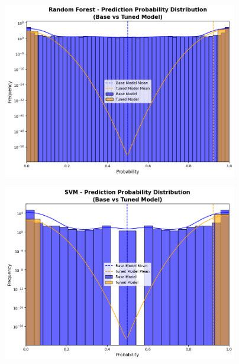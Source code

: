                 \begin{minipage}{\textwidth}
                    \centering
                    \begin{minipage}[c]{\textwidth}
                        \centering
                        \includegraphics[width=0.77\textwidth]{../figures/plots/section2/Random_Forest_Probability_distribution.png}
                        \label{fig:rf_cm_base}
                    \end{minipage}%
                \end{minipage}

                \begin{minipage}{\textwidth}
                    \centering
                    \begin{minipage}[c]{\textwidth}
                        \centering
                        \includegraphics[width=0.77\textwidth]{../figures/plots/section2/SVM_Probability_distribution.png}
                        \label{fig:rf_cm_base}
                    \end{minipage}%
                \end{minipage}
                
        \clearpage %
        